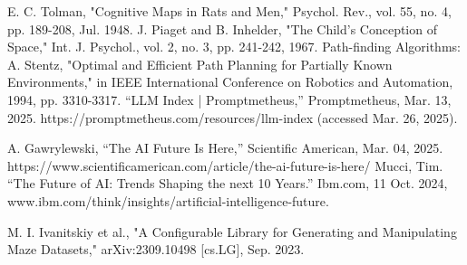 \documentclass[conference]{IEEEtran}
\begin{document}
\begin{thebibliography}{00}
 E. C. Tolman, "Cognitive Maps in Rats and Men," Psychol. Rev., vol. 55, no. 4, pp. 189-208, Jul. 1948.
 J. Piaget and B. Inhelder, "The Child's Conception of Space," Int. J. Psychol., vol. 2, no. 3, pp. 241-242, 1967.
 Path-finding Algorithms: A. Stentz, "Optimal and Efficient Path Planning for Partially Known Environments," in IEEE International Conference on Robotics and Automation, 1994, pp. 3310-3317.
 “LLM Index | Promptmetheus,” Promptmetheus, Mar. 13, 2025. https://promptmetheus.com/resources/llm-index (accessed Mar. 26, 2025).

 A. Gawrylewski, “The AI Future Is Here,” Scientific American, Mar. 04, 2025. https://www.scientificamerican.com/article/the-ai-future-is-here/
 Mucci, Tim. “The Future of AI: Trends Shaping the next 10 Years.” Ibm.com, 11 Oct. 2024, www.ibm.com/think/insights/artificial-intelligence-future.

 M. I. Ivanitskiy et al., "A Configurable Library for Generating and Manipulating Maze Datasets," arXiv:2309.10498 [cs.LG], Sep. 2023.
\end{thebibliography}
\end{document}
